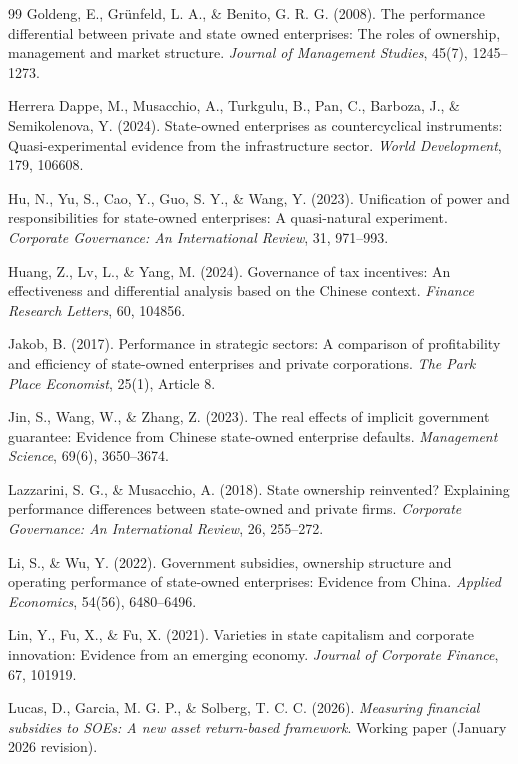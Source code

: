 \documentclass[11pt,a4paper]{article}
\begin{document}
\begin{thebibliography}{99}
 Goldeng, E., Gr\"unfeld, L. A., \& Benito, G. R. G. (2008). The performance differential between private and state owned enterprises: The roles of ownership, management and market structure. \emph{Journal of Management Studies}, 45(7), 1245--1273.

 Herrera Dappe, M., Musacchio, A., Turkgulu, B., Pan, C., Barboza, J., \& Semikolenova, Y. (2024). State-owned enterprises as countercyclical instruments: Quasi-experimental evidence from the infrastructure sector. \emph{World Development}, 179, 106608.

 Hu, N., Yu, S., Cao, Y., Guo, S. Y., \& Wang, Y. (2023). Unification of power and responsibilities for state-owned enterprises: A quasi-natural experiment. \emph{Corporate Governance: An International Review}, 31, 971--993.

 Huang, Z., Lv, L., \& Yang, M. (2024). Governance of tax incentives: An effectiveness and differential analysis based on the Chinese context. \emph{Finance Research Letters}, 60, 104856.

 Jakob, B. (2017). Performance in strategic sectors: A comparison of profitability and efficiency of state-owned enterprises and private corporations. \emph{The Park Place Economist}, 25(1), Article 8.

 Jin, S., Wang, W., \& Zhang, Z. (2023). The real effects of implicit government guarantee: Evidence from Chinese state-owned enterprise defaults. \emph{Management Science}, 69(6), 3650--3674.

 Lazzarini, S. G., \& Musacchio, A. (2018). State ownership reinvented? Explaining performance differences between state-owned and private firms. \emph{Corporate Governance: An International Review}, 26, 255--272.

 Li, S., \& Wu, Y. (2022). Government subsidies, ownership structure and operating performance of state-owned enterprises: Evidence from China. \emph{Applied Economics}, 54(56), 6480--6496.

 Lin, Y., Fu, X., \& Fu, X. (2021). Varieties in state capitalism and corporate innovation: Evidence from an emerging economy. \emph{Journal of Corporate Finance}, 67, 101919.

 Lucas, D., Garcia, M. G. P., \& Solberg, T. C. C. (2026). \emph{Measuring financial subsidies to SOEs: A new asset return-based framework}. Working paper (January 2026 revision).


\end{thebibliography}
\end{document}
